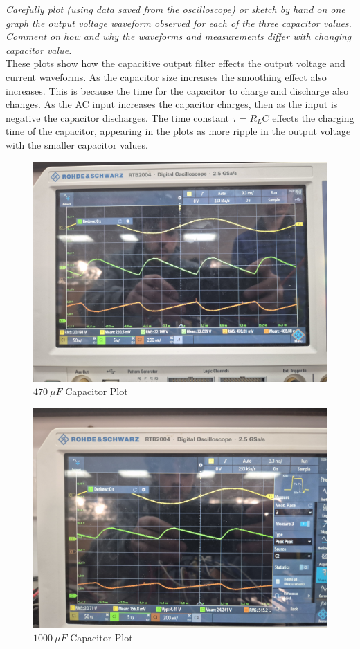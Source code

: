 \documentclass[12pt,a4paper]{article}
\begin{document}
\textit{Carefully plot (using data saved from the oscilloscope) or sketch by hand on one graph the output voltage waveform observed for each of the three capacitor values. Comment on how and why the
waveforms and measurements differ with changing capacitor value.}\\

These plots show how the capacitive output filter effects the output voltage and current waveforms. As the capacitor size increases the smoothing effect also increases. This is because the time for the capacitor to charge and discharge also changes. As the AC input increases the capacitor charges, then as the input is negative the capacitor discharges. The time constant $\tau=R_LC$ effects the charging time of the capacitor, appearing in the plots as more ripple in the output voltage with the smaller capacitor values.\\
\begin{figure}[H]
        \centering
	\includegraphics[width=0.7\columnwidth]{Images/20250828_134829.jpg}
	\caption{$470\:\mu F$ Capacitor Plot}
	\label{fig:470F Cap Plot}
\end{figure}
\begin{figure}[H]
        \centering
	\includegraphics[width=0.7\columnwidth]{Images/20250828_135102.jpg}
	\caption{$1000\:\mu F$ Capacitor Plot}
	\label{fig:1000F Cap Plot}
\end{figure}
\end{document}
